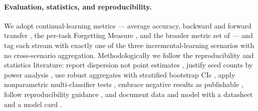 \paragraph{Evaluation, statistics, and reproducibility.} We adopt
continual-learning metrics --- average accuracy, backward and forward transfer
\citep{lopezpaz2017gem}, the per-task Forgetting Measure
\citep{chaudhry2018riemannian}, and the broader metric set of
\citet{diazrodriguez2018metrics} --- and tag each stream with exactly one of the
three incremental-learning scenarios \citep{vandeven2022threetypes} with no
cross-scenario aggregation. Methodologically we follow the reproducibility and
statistics literature: report dispersion not point estimates
\citep{henderson2018rldrl}, justify seed counts by power analysis
\citep{colas2018seeds}, use robust aggregates with stratified bootstrap CIs
\citep{agarwal2021rliable}, apply nonparametric multi-classifier tests
\citep{demsar2006statistical}, embrace negative results as publishable
\citep{karl2024negative}, follow reproducibility guidance
\citep{pineau2021reproducibility}, and document data and model with a datasheet
\citep{gebru2021datasheets} and a model card \citep{mitchell2019modelcards}.
